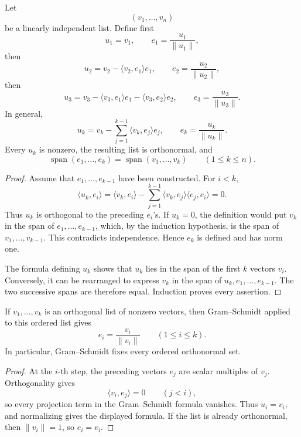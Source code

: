 \begin{theorem}
Let
\[
(v_1,\ldots,v_n)
\]
be a linearly independent list. Define first
\[
u_1=v_1,
\qquad
e_1=\frac{u_1}{\lVert u_1\rVert},
\]
then
\[
u_2=v_2-\langle v_2,e_1\rangle e_1,
\qquad
e_2=\frac{u_2}{\lVert u_2\rVert},
\]
then
\[
u_3=v_3-\langle v_3,e_1\rangle e_1
-\langle v_3,e_2\rangle e_2,
\qquad
e_3=\frac{u_3}{\lVert u_3\rVert}.
\]
In general,
\[
u_k=v_k-\sum_{j=1}^{k-1}\langle v_k,e_j\rangle e_j,
\qquad
e_k=\frac{u_k}{\lVert u_k\rVert}.
\]
Every \(u_k\) is nonzero, the resulting list is orthonormal, and
\[
\operatorname{span}(e_1,\ldots,e_k)
=\operatorname{span}(v_1,\ldots,v_k)
\qquad(1\leq k\leq n).
\]
\end{theorem}
\begin{proof}
Assume that \(e_1,\ldots,e_{k-1}\) have been constructed. For \(i<k\),
\[
\langle u_k,e_i\rangle
=\langle v_k,e_i\rangle
-\sum_{j=1}^{k-1}\langle v_k,e_j\rangle\langle e_j,e_i\rangle
=0.
\]
Thus \(u_k\) is orthogonal to the preceding \(e_i\)'s. If \(u_k=0\), the
definition would put \(v_k\) in the span of \(e_1,\ldots,e_{k-1}\), which,
by the induction hypothesis, is the span of \(v_1,\ldots,v_{k-1}\). This
contradicts independence. Hence \(e_k\) is defined and has norm one.

The formula defining \(u_k\) shows that \(u_k\) lies in the span of the first
\(k\) vectors \(v_i\). Conversely, it can be rearranged to express \(v_k\)
in the span of \(u_k,e_1,\ldots,e_{k-1}\). The two successive spans are
therefore equal. Induction proves every assertion.
\end{proof}

\begin{corollary}
If \(v_1,\ldots,v_k\) is an orthogonal list of nonzero vectors, then
Gram--Schmidt applied to this ordered list gives
\[
e_i=\frac{v_i}{\lVert v_i\rVert}
\qquad(1\leq i\leq k).
\]
In particular, Gram--Schmidt fixes every ordered orthonormal set.
\end{corollary}
\begin{proof}
At the \(i\)-th step, the preceding vectors \(e_j\) are scalar multiples of
\(v_j\).  Orthogonality gives
\[
\langle v_i,e_j\rangle=0
\qquad(j<i),
\]
so every projection term in the Gram--Schmidt formula vanishes.  Thus
\(u_i=v_i\), and normalizing gives the displayed formula.  If the list is
already orthonormal, then \(\lVert v_i\rVert=1\), so \(e_i=v_i\).
\end{proof}

